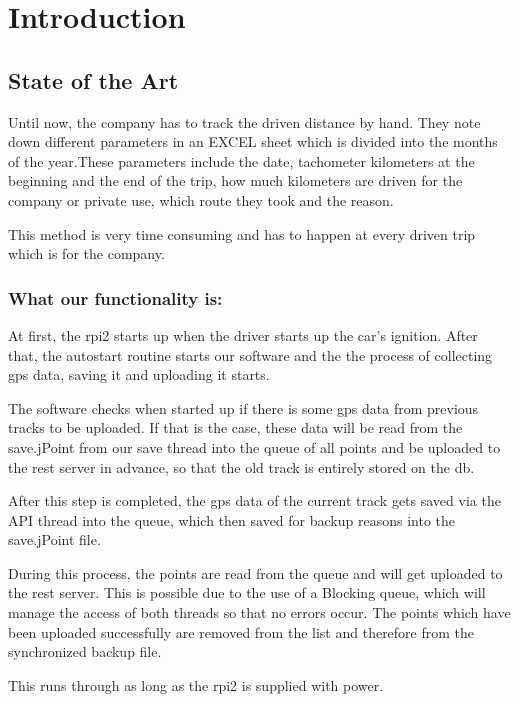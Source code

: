 \newpage
\chapter*{Introduction}
\section*{State of the Art}
Until now, the company has to track the driven distance by hand. They note down different parameters in an EXCEL sheet which is divided into the months of the year.These parameters include the date, tachometer kilometers at the beginning and the end of the trip, how much kilometers are driven for the company or private use, which route they took and the reason.

This method is very time consuming and has to happen at every driven trip which is for the company. 
\subsection*{What our functionality is:}
At first, the \gls{rpi2} starts up when the driver starts up the car's ignition. After that, the autostart routine starts our software and the the process of collecting \gls{gps} data, saving it and uploading it starts.

The software checks when started up if there is some \gls{gps} data from previous tracks to be uploaded. If that is the case, these data will be read from the save.jPoint from our save thread into the queue of all points and be uploaded to the \gls{rest} server in advance, so that the old track is entirely stored on the \gls{db}. 

After this step is completed, the \gls{gps} data of the current track gets saved via the API thread into the queue, which then saved for backup reasons into the save.jPoint file.

During this process, the points are read from the queue and will get uploaded to the \gls{rest} server. This is possible due to the use of a Blocking queue, which will manage the access of both threads so that no errors occur.\newline
The points which have been uploaded successfully are removed from the list and therefore from the synchronized backup file.

This runs through as long as the \gls{rpi2} is supplied with power.


\newpage
